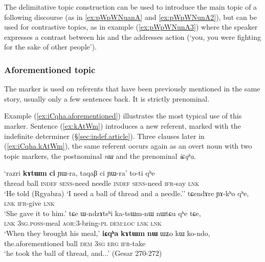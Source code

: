 The delimitative topic  construction can be used to introduce the main topic of a following discourse (as in \ref{ex:pWpWNuanA} and \ref{ex:pWpWNunA2}), but can be used for contrastive topics, as in example (\ref{ex:pWpWNunA3}) where the speaker expresses a contrast between his and the addresses action (`you, you were fighting for the sake of other people').

 
 \subsubsection{Aforementioned topic} \label{sec:iCqha}
 The marker   is used on referents that have been previously mentioned in the same story, usually only a few sentences back. It is strictly prenominal. 
 
Example (\ref{ex:iCqha.aforementioned}) illustrates the most typical use of this marker. Sentence (\ref{ex:kAtWm}) introduces a new referent,  marked with the indefinite determiner  (§\ref{sec:indef.article}). Three clauses later in (\ref{ex:iCqha.kAtWm}), the same referent occurs again as an overt noun with two topic markers, the postnominal \textit{nɯ} and the prenominal \textit{iɕqʰa}.
 
  
\begin{exe}
\ex \label{ex:iCqha.aforementioned}
\begin{xlist}
\ex \label{ex:kAtWm}
\gll `razri \textbf{kɤtɯm} \textbf{ci} ɲɯ-ra, taqaβ ci ɲɯ-ra' to-ti qʰe   \\
 thread ball \textsc{indef} \textsc{sens}-need needle \textsc{indef} \textsc{sens}-need \textsc{ifr}-say \textsc{lnk}  \\
\glt `He told (Rgyabza) `I need a ball of thread and a needle.''  
\ex  
\gll tɕendɤre ɲɤ-kʰo qʰe,  \\
\textsc{lnk} \textsc{ifr}-give \textsc{lnk}   \\
\glt `She gave it to him.'
\ex 
\gll  tɕe ɯ-ndzɤtsʰi ka-tsɯm-nɯ nɯtɕu qʰe tɕe,   \\
 \textsc{lnk} \textsc{3sg}.\textsc{poss}-meal \textsc{aor}:3\flobv{}-bring-\textsc{pl} \textsc{dem}:\textsc{loc}  \textsc{lnk} \textsc{lnk}    \\
\glt `When they brought his meal,'
\ex \label{ex:iCqha.kAtWm}
\gll   \textbf{iɕqʰa} \textbf{kɤtɯm} \textbf{nɯ} ɯʑo kɯ ko-ndo, \\
   the.aforementioned ball \textsc{dem} \textsc{3sg} \textsc{erg} \textsc{ifr}-take \\
\glt `he took the ball of thread, and...' (Gesar 270-272)
\end{xlist}
\end{exe}
 
